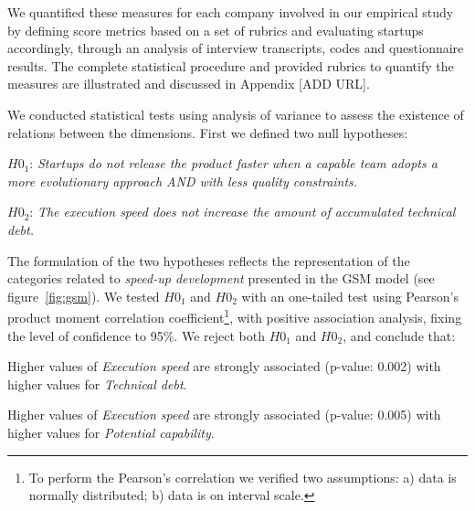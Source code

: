 \documentclass[10pt,journal,letterpaper,compsoc]{IEEEtran}
\begin{document}
We quantified these measures for each company involved in our empirical study
by defining score metrics based on a set of rubrics and evaluating startups
accordingly, through an analysis of interview transcripts, codes and
questionnaire results. The complete statistical procedure and provided rubrics
to quantify the measures are illustrated and discussed in Appendix [ADD URL]. 

We conducted statistical tests using analysis of variance to assess the 
existence of relations between the dimensions. First we defined two null 
hypotheses:

\begin{compactitem} 
\item[$H0_1$:] \textit{Startups do not release the product faster when a 
capable team adopts a more evolutionary approach AND with less quality 
constraints.}
\item[$H0_2$:] \textit{The execution speed does not increase the amount of 
accumulated technical debt.}
\end{compactitem}

The formulation of the two hypotheses reflects the representation of the
categories related to \textit{speed-up development} presented in the GSM model
(see figure~\ref{fig:gsm}). We tested $H0_1$ and $H0_2$ with an one-tailed
test using Pearson's product moment correlation coefficient\footnote{To perform
the Pearson's correlation we verified two assumptions: a) data is normally
distributed; b) data is on interval scale.}, with positive association
analysis, fixing the level of confidence to 95\%. We reject both $H0_1$ and
$H0_2$, and conclude that: 
\begin{compactenum}
\item Higher values of \textit{Execution speed} are strongly associated 
(p-value: 0.002) with higher values for \textit{Technical debt}.

\item Higher values of \textit{Execution speed} are strongly associated
(p-value: 0.005) with higher values for \textit{Potential capability}.
\end{compactenum}
\end{document}

